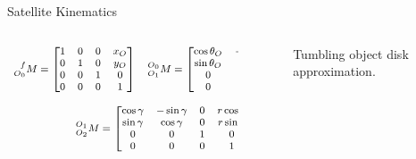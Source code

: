 \begin{frame}{Satellite Kinematics}
    \begin{columns}
        \begin{column}{0.5\textwidth}
            \begin{equation}
                \begin{footnotesize}
                \begin{array}{c}
                  \prescript{f}{O_0}{M}=\begin{bmatrix}
                    1&0&0&x_O\\
                  0&1&0&y_O\\
                  0&0&1&0\\
                  0&0&0&1
                  \end{bmatrix}\quad
                  \prescript{O_0}{O_1}{M}=\begin{bmatrix}
                    \cos{\theta_O}&-\sin{\theta_O}&0&0\\
                    \sin{\theta_O}&\cos{\theta_O}&0&0\\
                    0&0&1&0\\
                    0&0&0&1
                  \end{bmatrix}\\
                  \\
                  \prescript{O_1}{O_2}{M}=\begin{bmatrix}
                    \cos{\gamma}&-\sin{\gamma}&0&r \cos{\gamma}\\
                    \sin{\gamma}&\cos{\gamma}&0&r \sin{\gamma}\\
                    0&0&1&0\\
                    0&0&0&1
                  \end{bmatrix}
                \end{array}            
            \end{footnotesize}
              \end{equation}
        \end{column}
        \begin{column}{0.5\textwidth}
            \begin{figure}
                \centering
                \scalebox{0.6}{}
                \caption{Tumbling object disk approximation.}
              \end{figure}
        \end{column}
    \end{columns}
\end{frame}

